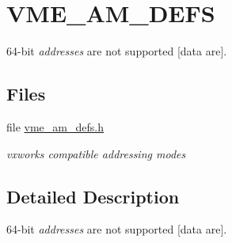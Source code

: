 \hypertarget{group__shared__vmeamdefs}{}\section{V\+M\+E\+\_\+\+A\+M\+\_\+\+D\+E\+FS}
\label{group__shared__vmeamdefs}


64-\/bit {\itshape addresses} are not supported \mbox{[}data are\mbox{]}.  


\subsection*{Files}
\begin{DoxyCompactItemize}
\item 
file \mbox{\hyperlink{vme__am__defs_8h}{vme\+\_\+am\+\_\+defs.\+h}}
\begin{DoxyCompactList}\small\item\em vxworks compatible addressing modes \end{DoxyCompactList}\end{DoxyCompactItemize}


\subsection{Detailed Description}
64-\/bit {\itshape addresses} are not supported \mbox{[}data are\mbox{]}. 

